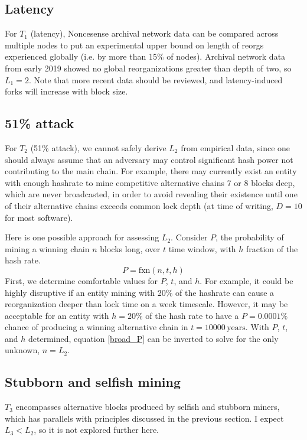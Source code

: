\documentclass{mrl}
\begin{document}
\subsection{Latency}
For $T_1$ (latency), Noncesense archival network data can be compared across multiple nodes to put an experimental upper bound on length of reorgs experienced globally (i.e. by more than 15\% of nodes). Archival network data from early 2019 showed no global reorganizations greater than depth of two, so $L_1 = 2$. Note that more recent data should be reviewed, and latency-induced forks will increase with block size. 

\subsection{51\% attack}
For $T_2$ (51\% attack), we cannot safely derive $L_2$ from empirical data, since one should always assume that an adversary may control significant hash power not contributing to the main chain. For example, there may currently exist an entity with enough hashrate to mine competitive alternative chains 7 or 8 blocks deep, which are never broadcasted, in order to avoid revealing their existence until one of their alternative chains exceeds common lock depth (at time of writing, $D = 10$ for most software). 

Here is one possible approach for assessing $L_2$. Consider $P$, the probability of mining a winning chain $n$ blocks long, over $t$ time window, with $h$ fraction of the hash rate. 
\begin{equation}P = \mathrm{fxn}(n, t, h)\label{broad_P}\end{equation}
First, we determine comfortable values for $P$, $t$, and $h$. For example, it could be highly disruptive if an entity mining with 20\% of the hashrate can cause a reorganization deeper than lock time on a week timescale. However, it may be acceptable for an entity with $h=20\%$ of the hash rate to have a $P=0.0001\%$ chance of producing a winning alternative chain in $t = 10000\, \mathrm{ years}$. With $P$, $t$, and $h$ determined, equation \ref{broad_P} can be inverted to solve for the only unknown, $n = L_2$.

\subsection{Stubborn and selfish mining}
$T_3$ encompasses alternative blocks produced by selfish and stubborn miners, which has parallels with principles discussed in the previous section. I expect $L_3 < L_2$, so it is not explored further here.
\end{document}
